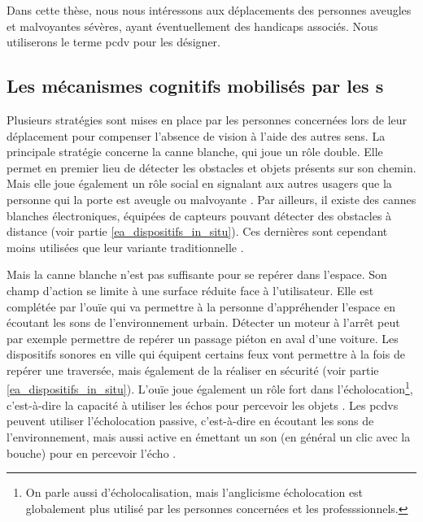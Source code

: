 \newpar{}

Dans cette thèse, nous nous intéressons aux déplacements des personnes aveugles et malvoyantes sévères, ayant éventuellement des handicaps associés. Nous utiliserons le terme \gls{pcdv} pour les désigner.

\subsection{Les mécanismes cognitifs mobilisés par les s}

%
%

Plusieurs stratégies sont mises en place par les personnes concernées lors de leur déplacement pour compenser l'absence de vision à l'aide des autres sens. La principale stratégie concerne la canne blanche, qui joue un rôle double. Elle permet en premier lieu de détecter les obstacles et objets présents sur son chemin. Mais elle joue également un rôle social en signalant aux autres usagers que la personne qui la porte est aveugle ou malvoyante \citep{ratelle_manuel_2019}. Par ailleurs, il existe des cannes blanches électroniques, équipées de capteurs pouvant détecter des obstacles à distance (voir partie \ref{ea_dispositifs_in_situ}). Ces dernières sont cependant moins utilisées que leur variante traditionnelle \citep{homere_2023}. 

\newpar{}

Mais la canne blanche n'est pas suffisante pour se repérer dans l'espace. Son champ d'action se limite à une surface réduite face à l'utilisateur. Elle est complétée par l'ouïe qui va permettre à la personne d'appréhender l'espace en écoutant les sons de l'environnement urbain. Détecter un moteur à l'arrêt peut par exemple permettre de repérer un passage piéton en aval d'une voiture. Les dispositifs sonores en ville qui équipent certains feux vont permettre à la fois de repérer une traversée, mais également de la réaliser en sécurité (voir partie \ref{ea_dispositifs_in_situ}). L'ouïe joue également un rôle fort dans l'écholocation\footnote{On parle aussi d'écholocalisation, mais l'anglicisme écholocation est globalement plus utilisé par les personnes concernées et les professsionnels.}, c’est-à-dire la capacité à utiliser les échos pour percevoir les objets \citep{Brazier2008}. Les \glspl{pcdv} peuvent utiliser l'écholocation passive, c'est-à-dire en écoutant les sons de l'environnement, mais aussi active en émettant un son (en général un clic avec la bouche) pour en percevoir l'écho \citep{thaler2016}.


